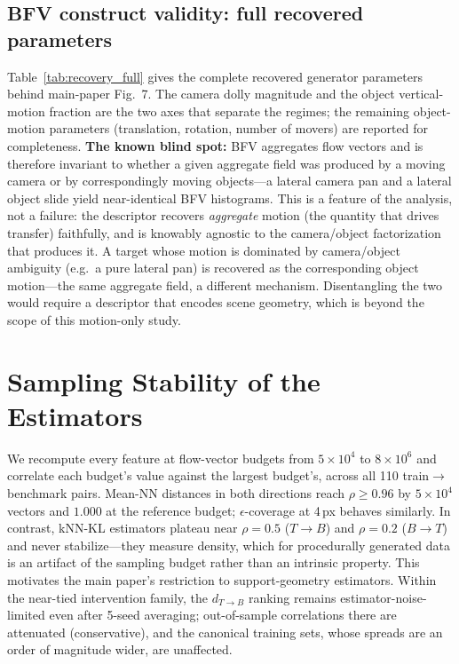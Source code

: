 \documentclass[runningheads]{llncs}
\newcommand{\dtb}{d_{T\to B}}
\begin{document}
\subsection{BFV construct validity: full recovered parameters}
Table~\ref{tab:recovery_full} gives the complete recovered generator
parameters behind main-paper Fig.~7. The camera dolly magnitude and the object
vertical-motion fraction are the two axes that separate the regimes; the
remaining object-motion parameters (translation, rotation, number of movers)
are reported for completeness. \textbf{The known blind spot:} BFV aggregates
flow vectors and is therefore invariant to whether a given aggregate field was
produced by a moving camera or by correspondingly moving objects---a lateral
camera pan and a lateral object slide yield near-identical BFV histograms. This
is a feature of the analysis, not a failure: the descriptor recovers
\emph{aggregate} motion (the quantity that drives transfer) faithfully, and is
knowably agnostic to the camera/object factorization that produces it. A
target whose motion is dominated by camera/object ambiguity (e.g.\ a pure
lateral pan) is recovered as the corresponding object motion---the same
aggregate field, a different mechanism. Disentangling the two would require a
descriptor that encodes scene geometry, which is beyond the scope of this
motion-only study.

\begin{table}[h]
\centering
\caption{Full recovered generator parameters from BFV-only search.}
\label{tab:recovery_full}
\small

\end{table}

\section{Sampling Stability of the Estimators}
\label{supp:sampling}

We recompute every feature at flow-vector budgets from $5{\times}10^4$ to
$8{\times}10^6$ and correlate each budget's value against the largest
budget's, across all 110 train$\to$benchmark pairs. Mean-NN distances in both
directions reach $\rho \ge 0.96$ by $5{\times}10^4$ vectors and $1.000$ at
the reference budget; $\epsilon$-coverage at 4\,px behaves similarly. In
contrast, kNN-KL estimators plateau near $\rho{=}0.5$ ($T{\to}B$) and
$\rho{=}0.2$ ($B{\to}T$) and never stabilize---they measure density, which
for procedurally generated data is an artifact of the sampling budget rather
than an intrinsic property. This motivates the main paper's restriction to
support-geometry estimators. Within the near-tied intervention family, the
$\dtb$ ranking remains estimator-noise-limited even after 5-seed averaging;
out-of-sample correlations there are attenuated (conservative), and the
canonical training sets, whose spreads are an order of magnitude wider, are
unaffected.
\end{document}
